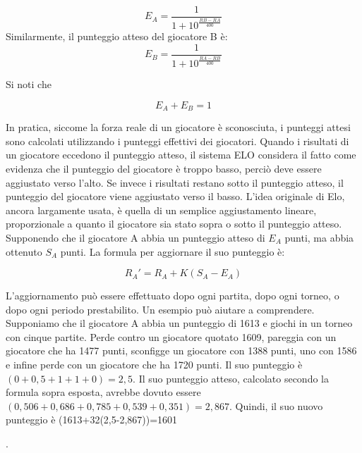\begin{equation}  E_{A}={\frac{{1}}{{1+10^\frac{{{RB} - {RA}}}{{400}}}}} \end{equation}
Similarmente, il punteggio atteso del giocatore B è:
\begin{equation}  E_{B}={\frac{{1}}{{1+10^\frac{{{RA} - {RB}}}{{400}}}}} \end{equation}

Si noti che {\begin{equation}E_{A} +  E_{B}=1 \end{equation}

In pratica, siccome la forza reale di un giocatore è sconosciuta, i punteggi attesi sono calcolati utilizzando i punteggi effettivi dei giocatori. Quando i risultati di un giocatore eccedono il punteggio atteso,
il sistema ELO considera il fatto come evidenza che il punteggio del giocatore è troppo basso, perciò deve essere aggiustato verso l'alto. Se invece i risultati restano sotto il punteggio atteso, 
il punteggio del giocatore viene aggiustato verso il basso. L'idea originale di Elo, ancora largamente usata, è quella di un semplice aggiustamento lineare, proporzionale a quanto il giocatore sia stato
sopra o sotto il punteggio atteso. 
Supponendo che il giocatore A abbia un punteggio atteso di ${E_{A}}$ punti, ma abbia ottenuto ${S_{A}}$ punti. La formula per aggiornare il suo punteggio è:

\begin{equation} R_{A}' =R_{A}+K(S_{A}-E_{A})\end{equation}

L'aggiornamento può essere effettuato dopo ogni partita, dopo ogni torneo, o dopo ogni periodo prestabilito. Un esempio può aiutare a comprendere. Supponiamo che il giocatore A abbia un punteggio di 1613 
e giochi in un torneo con cinque partite. Perde contro un giocatore quotato 1609, pareggia con un giocatore che ha 1477 punti, sconfigge un giocatore con 1388 punti, uno con 1586 e infine perde con un giocatore 
che ha 1720 punti. Il suo punteggio è $ {(0+0,5+1+1+0)=2,5}$. Il suo punteggio atteso, calcolato secondo la formula sopra esposta, avrebbe dovuto essere 
$ (0,506+0,686+0,785+0,539+0,351)=2,867 $. Quindi, il suo nuovo punteggio è (1613+32(2,5-2,867))=1601} \cite{itwiki:125247032}.

